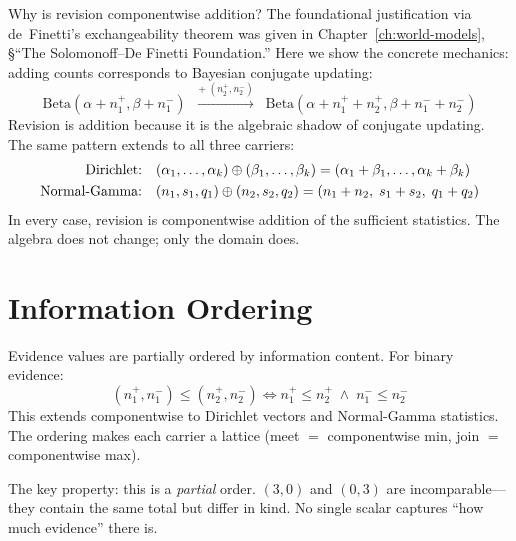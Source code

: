 \documentclass[11pt,openany]{report}
\begin{document}
Why is revision componentwise addition?  The foundational justification
via de~Finetti's exchangeability theorem was given in
Chapter~\ref{ch:world-models}, \S``The Solomonoff--De Finetti
Foundation.''  Here we show the concrete mechanics: adding counts
corresponds to Bayesian conjugate updating:
\[
  \text{Beta}(\alpha + n_1^+, \beta + n_1^-)
  \;\;\xrightarrow{+\;(n_2^+, n_2^-)}\;\;
  \text{Beta}(\alpha + n_1^+ + n_2^+, \beta + n_1^- + n_2^-)
\]
Revision is addition because it is the algebraic shadow of conjugate
updating.  The same pattern extends to all three carriers:
\begin{align*}
  \text{Dirichlet:}\quad
  &(\alpha_1, \ldots, \alpha_k) \oplus (\beta_1, \ldots, \beta_k)
  = (\alpha_1 + \beta_1, \ldots, \alpha_k + \beta_k) \\
  \text{Normal-Gamma:}\quad
  &(n_1, s_1, q_1) \oplus (n_2, s_2, q_2)
  = (n_1 + n_2,\; s_1 + s_2,\; q_1 + q_2)
\end{align*}
In every case, revision is componentwise addition of the sufficient
statistics.  The algebra does not change; only the domain does.


\section{Information Ordering}

Evidence values are partially ordered by information content.  For
binary evidence:
\[
  (n_1^+, n_1^-) \le (n_2^+, n_2^-) \iff
  n_1^+ \le n_2^+ \;\wedge\; n_1^- \le n_2^-
\]
This extends componentwise to Dirichlet vectors and Normal-Gamma
statistics.  The ordering makes each carrier a lattice (meet $=$
componentwise min, join $=$ componentwise max).

The key property: this is a \emph{partial} order.  $(3, 0)$ and
$(0, 3)$ are incomparable---they contain the same total but differ in
kind.  No single scalar captures ``how much evidence'' there is.
\end{document}

